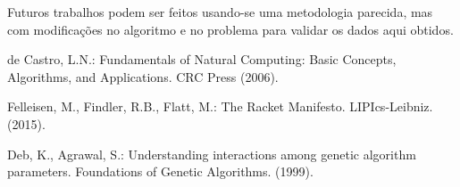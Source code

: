 \documentclass{llncs}
\begin{document}
Futuros trabalhos podem ser feitos usando-se uma metodologia parecida, mas com modificações no algoritmo e no problema para validar os dados aqui obtidos.

%
%
\begin{thebibliography}{5}
%

de Castro, L.N.: Fundamentals of Natural Computing: Basic Concepts, Algorithms, and Applications. CRC Press (2006).

Felleisen, M., Findler, R.B., Flatt, M.: The Racket Manifesto. LIPIcs-Leibniz. (2015).

Deb, K., Agrawal, S.: Understanding interactions among genetic algorithm parameters. Foundations of Genetic Algorithms. (1999).

\end{thebibliography}
\end{document}
